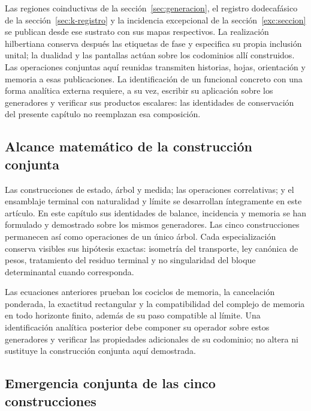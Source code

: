 Las regiones coinductivas de la sección~\ref{sec:generacion}, el registro
dodecafásico de la sección~\ref{sec:k-registro} y la incidencia excepcional
de la sección~\ref{exc:seccion} se publican desde ese sustrato con sus mapas
respectivos. La realización hilbertiana conserva después las etiquetas de
fase y especifica su propia inclusión unital; la dualidad y las pantallas
actúan sobre los codominios allí construidos. Las operaciones conjuntas aquí
reunidas transmiten historias, hojas, orientación y memoria a esas
publicaciones. La identificación de un funcional concreto con una forma
analítica externa requiere, a su vez, escribir su aplicación sobre los
generadores y verificar sus productos escalares: las identidades de
conservación del presente capítulo no reemplazan esa composición.

\subsection{Alcance matemático de la construcción conjunta}
Las construcciones de estado, árbol y medida; las operaciones correlativas; y
el ensamblaje terminal con naturalidad y límite se desarrollan íntegramente
en este artículo. En este capítulo sus identidades de
balance, incidencia y memoria se han formulado y demostrado sobre los mismos
generadores. Las cinco construcciones permanecen así como operaciones de un
único árbol. Cada especialización conserva visibles sus hipótesis exactas:
isometría del transporte, ley canónica de pesos, tratamiento del residuo
terminal y no singularidad del bloque determinantal cuando corresponda.

Las ecuaciones anteriores prueban los cociclos de memoria, la cancelación
ponderada, la exactitud rectangular y la compatibilidad del complejo de
memoria en todo horizonte finito, además de su paso compatible al límite.
Una identificación analítica posterior debe componer su operador sobre estos
generadores y verificar las propiedades adicionales de su codominio; no
altera ni sustituye la construcción conjunta aquí demostrada.

\iffalse
\subsection{Emergencia conjunta de las cinco construcciones}
\label{sec:cinco-construcciones-continuo-ch}

